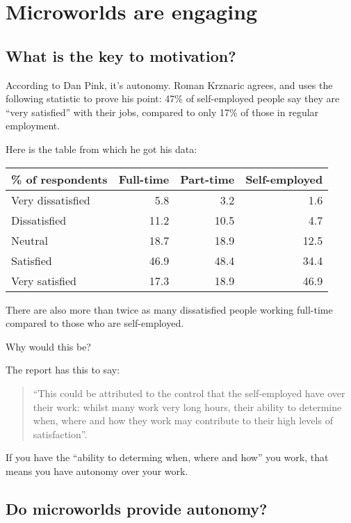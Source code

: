 \section{Microworlds are engaging}

\subsection{What is the key to motivation?}

According to Dan Pink, it's autonomy\cite{drive}. Roman Krznaric agrees, and uses
the following statistic to prove his point: 47\% of self-employed people
say they are ``very satisfied'' with their jobs, compared to only 17\% of those in regular employment\cite{krznaric}.

Here is the table from which he got his data\cite{joywork}:

\begin{center}
  \begin{tabular}{ | l | r | r | r | }
    \hline
    \textbf{\% of respondents} & \textbf{Full-time} & \textbf{Part-time} & \textbf{Self-employed} \\ \hline
    Very dissatisfied & 5.8 & 3.2 & 1.6 \\
    Dissatisfied & 11.2 & 10.5 & 4.7 \\
    Neutral & 18.7 & 18.9 & 12.5 \\
    Satisfied & 46.9 & 48.4 & 34.4 \\
    Very satisfied & 17.3 & 18.9 & 46.9 \\
    \hline
  \end{tabular}
\end{center}

There are also more than twice as many dissatisfied people working full-time
compared to those who are self-employed.

Why would this be?

The report has this to say:

\begin{quote}
``This could be attributed to the control that the self-employed have over
their work: whilst many work very long hours, their ability to determine
when, where and how they work may contribute to their high levels of
satisfaction''\cite{joywork}.
\end{quote}

If you have the ``ability to determing when, where and how'' you work,
that means you have autonomy over your work.

\subsection{Do microworlds provide autonomy?}

